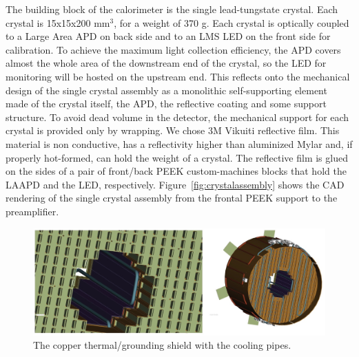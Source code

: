 The building block of the calorimeter is the
single lead-tungstate crystal. Each crystal
is 15x15x200 mm$^3$, for a weight of
370 g.
Each crystal is optically coupled
to a Large Area APD on back side  and to an LMS LED on the front side for calibration. To achieve the maximum
light collection efficiency, the APD covers
almost the whole area of the downstream
end of the crystal, so the LED for monitoring
will be hosted on the upstream end. This
reflects onto the mechanical design of the single
crystal assembly 
as a monolithic self-supporting element made of
the crystal itself, the APD, the reflective coating
 and some support structure.
To avoid dead volume in the detector,
the mechanical support for each crystal is provided only by wrapping. We chose 3M Vikuiti reflective film. This material is non conductive, has a reflectivity higher
than aluminized Mylar and, if properly
hot-formed, can hold the weight of a crystal. The reflective film is glued on the sides of a pair of front/back PEEK custom-machines blocks that hold the LAAPD and the LED, respectively. Figure~\ref{fig:crystalassembly} shows the CAD rendering of the single
crystal assembly from the frontal PEEK support
to the  preamplifier.
\begin{figure}[th!]
\centering 
\includegraphics[width=1.0\columnwidth]{./fig/raff.jpeg}
\caption{The copper thermal/grounding shield
with the cooling pipes.}
\label{fig:piping} 
\end{figure}

